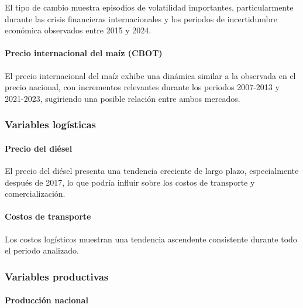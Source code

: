 \documentclass[11pt]{article}
\begin{document}
El tipo de cambio muestra episodios de volatilidad importantes,
particularmente durante las crisis financieras internacionales y los
periodos de incertidumbre económica observados entre 2015 y 2024.

\hypertarget{precio-internacional-del-mauxedz-cbot}{%
\paragraph{Precio internacional del maíz
(CBOT)}\label{precio-internacional-del-mauxedz-cbot}}

El precio internacional del maíz exhibe una dinámica similar a la
observada en el precio nacional, con incrementos relevantes durante los
periodos 2007-2013 y 2021-2023, sugiriendo una posible relación entre
ambos mercados.

\hypertarget{variables-loguxedsticas}{%
\subsubsection{Variables logísticas}\label{variables-loguxedsticas}}

\hypertarget{precio-del-diuxe9sel}{%
\paragraph{Precio del diésel}\label{precio-del-diuxe9sel}}

El precio del diésel presenta una tendencia creciente de largo plazo,
especialmente después de 2017, lo que podría influir sobre los costos de
transporte y comercialización.

\hypertarget{costos-de-transporte}{%
\paragraph{Costos de transporte}\label{costos-de-transporte}}

Los costos logísticos muestran una tendencia ascendente consistente
durante todo el periodo analizado.

\hypertarget{variables-productivas}{%
\subsubsection{Variables productivas}\label{variables-productivas}}

\hypertarget{producciuxf3n-nacional}{%
\paragraph{Producción nacional}\label{producciuxf3n-nacional}}
\end{document}
